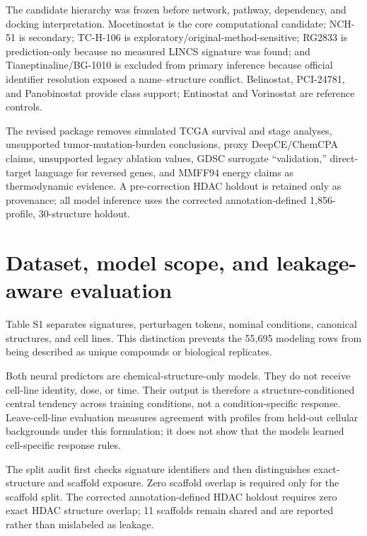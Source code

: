 \documentclass[10pt]{article}
\begin{document}
The candidate hierarchy was frozen before network, pathway, dependency, and docking interpretation. Mocetinostat is the core computational candidate; NCH-51 is secondary; TC-H-106 is exploratory/original-method-sensitive; RG2833 is prediction-only because no measured LINCS signature was found; and Tianeptinaline/BG-1010 is excluded from primary inference because official identifier resolution exposed a name--structure conflict. Belinostat, PCI-24781, and Panobinostat provide class support; Entinostat and Vorinostat are reference controls.

The revised package removes simulated TCGA survival and stage analyses, unsupported tumor-mutation-burden conclusions, proxy DeepCE/ChemCPA claims, unsupported legacy ablation values, GDSC surrogate ``validation,'' direct-target language for reversed genes, and MMFF94 energy claims as thermodynamic evidence. A pre-correction HDAC holdout is retained only as provenance; all model inference uses the corrected annotation-defined 1,856-profile, 30-structure holdout.

\section{Dataset, model scope, and leakage-aware evaluation}

Table S1 separates signatures, perturbagen tokens, nominal conditions, canonical structures, and cell lines. This distinction prevents the 55,695 modeling rows from being described as unique compounds or biological replicates.



Both neural predictors are chemical-structure-only models. They do not receive cell-line identity, dose, or time. Their output is therefore a structure-conditioned central tendency across training conditions, not a condition-specific response. Leave-cell-line evaluation measures agreement with profiles from held-out cellular backgrounds under this formulation; it does not show that the models learned cell-specific response rules.



The split audit first checks signature identifiers and then distinguishes exact-structure and scaffold exposure. Zero scaffold overlap is required only for the scaffold split. The corrected annotation-defined HDAC holdout requires zero exact HDAC structure overlap; 11 scaffolds remain shared and are reported rather than mislabeled as leakage.
\end{document}
